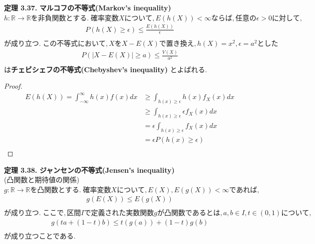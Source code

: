 \documentclass[dvipdfmx,10pt, a4j]{jarticle}
\theoremstyle{definition}
\begin{document}
\newpage
\noindent
\textbf{定理 3.37.} \textbf{マルコフの不等式(Markov's inequality)}\\
$h: \mathbb{R} \to \mathbb{R} を非負関数とする.\; 確率変数Xについて,E(h(X)) < \infty ならば, 任意の \epsilon > 0 に対して,$\\
\begin{align*}
    P(h(X) \geq \epsilon) \leq \frac{E(h(X))}{\epsilon} \\
\end{align*}
$が成り立つ.\; この不等式において, X を X - E(X) で置き換え, h(X) = x^2, \epsilon = a^2 とした$\\
\begin{align*}
    P(|X-E(X)| \geq a) \leq \frac{V(X)}{a^2} \\
\end{align*}
は\textbf{チェビシェフの不等式(Chebyshev's inequality)} とよばれる.\\
\begin{proof}
    \begin{align*}
        E(h(X)) = \int_{-\infty}^{\infty}h(x)f(x)dx & \geq \int_{h(x) \geq \epsilon}h(x)f_X(x)dx      \\
                                                    & \geq \int_{h(x) \geq \epsilon}\epsilon f_X(x)dx \\
                                                    & = \epsilon \int_{h(x) \geq \epsilon}f_X(x)dx    \\
                                                    & = \epsilon P(h(x) \geq \epsilon)                \\
    \end{align*}
\end{proof}

\noindent
\textbf{定理 3.38.} \textbf{ジャンセンの不等式(Jensen's inequality)}\\
(凸関数と期待値の関係)\\
$g: \mathbb{R} \to \mathbb{R} を凸関数とする.\; 確率変数Xについて, E(X), E(g(X)) < \infty であれば,$\\
\begin{align*}
    g(E(X)) \leq E(g(X)) \\
\end{align*}
$が成り立つ.\; ここで, 区間Iで定義された実数関数gが凸関数であるとは, a,b \in I, t \in (0, 1)について,$\\
\begin{align*}
    g(ta + (1-t)b) \leq t(g(a)) + (1-t)g(b) \\
\end{align*}
が成り立つことである.\\
\end{document}

